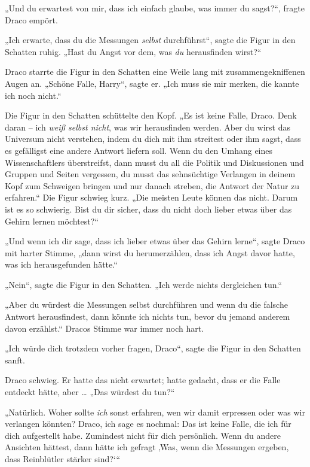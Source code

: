 „Und du erwartest von mir, dass ich einfach glaube, was immer du sagst?“, fragte Draco empört. 

„Ich erwarte, dass du die Messungen \emph{selbst} durchführst“, sagte die Figur in den Schatten ruhig. „Hast du Angst vor dem, was \emph{du} herausfinden wirst?“ 

Draco starrte die Figur in den Schatten eine Weile lang mit zusammengekniffenen Augen an. „Schöne Falle, Harry“, sagte er. „Ich muss sie mir merken, die kannte ich noch nicht.“ 

Die Figur in den Schatten schüttelte den Kopf. „Es ist keine Falle, Draco. Denk daran – ich \emph{weiß selbst nicht}, was wir herausfinden werden. Aber du wirst das Universum nicht verstehen, indem du dich mit ihm streitest oder ihm sagst, dass es gefälligst eine andere Antwort liefern soll. Wenn du den Umhang eines Wissenschaftlers überstreifst, dann musst du all die Politik und Diskussionen und Gruppen und Seiten vergessen, du musst das sehnsüchtige Verlangen in deinem Kopf zum Schweigen bringen und nur danach streben, die Antwort der Natur zu erfahren.“ Die Figur schwieg kurz. „Die meisten Leute können das nicht. Darum ist es so schwierig. Bist du dir sicher, dass du nicht doch lieber etwas über das Gehirn lernen möchtest?“ 

„Und wenn ich dir sage, dass ich lieber etwas über das Gehirn lerne“, sagte Draco mit harter Stimme, „dann wirst du herumerzählen, dass ich Angst davor hatte, was ich herausgefunden hätte.“ 

„Nein“, sagte die Figur in den Schatten. „Ich werde nichts dergleichen tun.“ 

„Aber du würdest die Messungen selbst durchführen und wenn du die falsche Antwort herausfindest, dann könnte ich nichts tun, bevor du jemand anderem davon erzählst.“ Dracos Stimme war immer noch hart. 

„Ich würde dich trotzdem vorher fragen, Draco“, sagte die Figur in den Schatten sanft. 

Draco schwieg. Er hatte das nicht erwartet; hatte gedacht, dass er die Falle entdeckt hätte, aber … „Das würdest du tun?“ 

„Natürlich. Woher sollte \emph{ich} sonst erfahren, wen wir damit erpressen oder was wir verlangen könnten? Draco, ich sage es nochmal: Das ist keine Falle, die ich für dich aufgestellt habe. Zumindest nicht für dich persönlich. Wenn du andere Ansichten hättest, dann hätte ich gefragt ‚Was, wenn die Messungen ergeben, dass Reinblütler stärker sind?‘“ 

